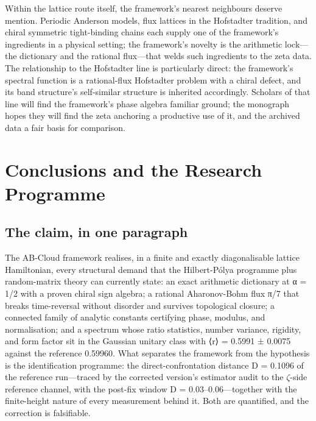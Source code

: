 \documentclass[10pt]{article}
\begin{document}
Within the lattice route itself, the framework's nearest neighbours deserve mention. Periodic Anderson models, flux lattices in the Hofstadter tradition, and chiral symmetric tight-binding chains each supply one of the framework's ingredients in a physical setting; the framework's novelty is the arithmetic lock---the dictionary and the rational flux---that welds such ingredients to the zeta data. The relationship to the Hofstadter line is particularly direct: the framework's spectral function is a rational-flux Hofstadter problem with a chiral defect, and its band structure's self-similar structure is inherited accordingly. Scholars of that line will find the framework's phase algebra familiar ground; the monograph hopes they will find the zeta anchoring a productive use of it, and the archived data a fair basis for comparison.

\section{Conclusions and the Research Programme}\label{sec:ch14}
\subsection{The claim, in one paragraph}\label{sec:141}
The AB-Cloud framework realises, in a finite and exactly diagonalisable lattice Hamiltonian, every structural demand that the Hilbert-Pólya programme plus random-matrix theory can currently state: an exact arithmetic dictionary at α = 1/2 with a proven chiral sign algebra; a rational Aharonov-Bohm flux π/7 that breaks time-reversal without disorder and survives topological closure; a connected family of analytic constants certifying phase, modulus, and normalisation; and a spectrum whose ratio statistics, number variance, rigidity, and form factor sit in the Gaussian unitary class with ⟨r⟩ = 0.5991 ± 0.0075 against the reference 0.59960. What separates the framework from the hypothesis is the identification programme: the direct-confrontation distance D = 0.1096 of the reference run---traced by the corrected version's estimator audit to the $\zeta$-side reference channel, with the post-fix window D = 0.03--0.06---together with the finite-height nature of every measurement behind it. Both are quantified, and the correction is falsifiable.
\end{document}

